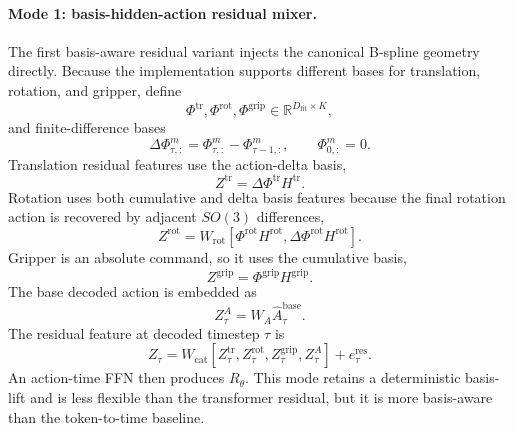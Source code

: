 \documentclass[10pt,twocolumn,letterpaper]{article}
\begin{document}
\paragraph{Mode 1: basis-hidden-action residual mixer.}
The first basis-aware residual variant injects the canonical B-spline geometry directly. Because the implementation supports different bases for translation, rotation, and gripper, define
\begin{equation}
\Phi^{\mathrm{tr}},\Phi^{\mathrm{rot}},\Phi^{\mathrm{grip}}
\in\mathbb{R}^{D_{\mathrm{fit}}\times K},
\end{equation}
and finite-difference bases
\begin{equation}
\Delta\Phi^{m}_{\tau,:}=\Phi^{m}_{\tau,:}-\Phi^{m}_{\tau-1,:},
\qquad
\Phi^{m}_{0,:}=0.
\end{equation}
Translation residual features use the action-delta basis,
\begin{equation}
Z^{\mathrm{tr}}=\Delta\Phi^{\mathrm{tr}}H^{\mathrm{tr}}.
\end{equation}
Rotation uses both cumulative and delta basis features because the final rotation action is recovered by adjacent $SO(3)$ differences,
\begin{equation}
Z^{\mathrm{rot}}
=
W_{\mathrm{rot}}\left[
\Phi^{\mathrm{rot}}H^{\mathrm{rot}},
\Delta\Phi^{\mathrm{rot}}H^{\mathrm{rot}}
\right].
\end{equation}
Gripper is an absolute command, so it uses the cumulative basis,
\begin{equation}
Z^{\mathrm{grip}}=\Phi^{\mathrm{grip}}H^{\mathrm{grip}}.
\end{equation}
The base decoded action is embedded as
\begin{equation}
Z^A_\tau=W_A\hat A^{\mathrm{base}}_{\tau}.
\end{equation}
The residual feature at decoded timestep $\tau$ is
\begin{equation}
Z_\tau
=
W_{\mathrm{cat}}
\left[
Z^{\mathrm{tr}}_\tau,
Z^{\mathrm{rot}}_\tau,
Z^{\mathrm{grip}}_\tau,
Z^{A}_\tau
\right]
+e_{\tau}^{\mathrm{res}}.
\end{equation}
An action-time FFN then produces $R_\theta$. This mode retains a deterministic basis-lift and is less flexible than the transformer residual, but it is more basis-aware than the token-to-time baseline.
\end{document}
